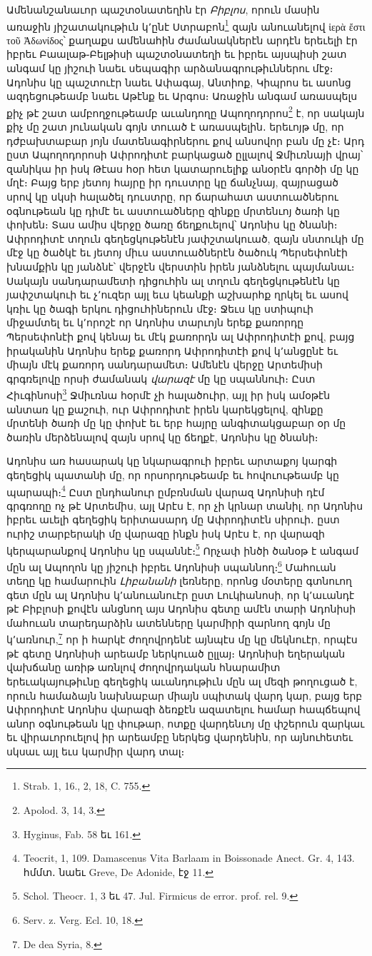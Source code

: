 \documentclass{article}
\begin{document}
{Ամենանշանաւոր պաշտօնատեղին էր \emph{Բիբլոս}, որուն մասին առաջին յիշատակութիւն կ՚ընէ Ստրաբոն\footnote{Strab. 1, 16., 2, 18, C. 755.} զայն անուանելով ἱερὰ ἔστι τοῦ Ἀδωνίδος՝ քաղաքս ամենահին ժամանակներէն արդէն երեւելի էր իբրեւ Բաալաթ֊Բելթիսի պաշտօնատեղի եւ իբրեւ այսպիսի շատ անգամ կը յիշուի նաեւ սեպագիր արձանագրութիւններու մէջ։ Ադոնիս կը պաշտուէր նաեւ Ափագայ, Անտիոք, Կիպրոս եւ ասոնց ազդեցութեամբ նաեւ Աթէնք եւ Արգոս։ Առաջին անգամ առասպելս քիչ թէ շատ ամբողջութեամբ աւանդողը Ապողոդորոս\footnote{Apolod. 3, 14, 3.} է, որ սակայն քիչ մը շատ յունական գոյն տուած է առասպելին․ երեւոյթ մը, որ դժբախտաբար յոյն մատենագիրներու քով անսովոր բան մը չէ։ Արդ ըստ Ապողոդորոսի Ափրոդիտէ բարկացած ըլլալով Ջմիւռնայի վրայ՝ զանիկա իր իսկ Թէաս հօր հետ կատարուելիք անօրէն գործի մը կը մղէ։ Բայց երբ յետոյ հայրը իր դուստրը կը ճանչնայ, զայրացած սրով կը սկսի հալածել դուստրը, որ ճարահատ աստուածներու օգնութեան կը դիմէ եւ աստուածները զինքը մրտենւոյ ծառի կը փոխեն։ Տաս ամիս վերջը ծառը ճեղքուելով՝ Ադոնիս կը ծնանի։ Ափրոդիտէ տղուն գեղեցկութենէն յափշտակուած, զայն սնտուկի մը մէջ կը ծածկէ եւ յետոյ միւս աստուածներէն ծածուկ Պերսեփոնէի խնամքին կը յանձնէ՝ վերջէն վերստին իրեն յանձնելու պայմանաւ։ Սակայն սանդարամետի դիցուհին ալ տղուն գեղեցկութենէն կը յափշտակուի եւ չ՚ուզեր այլ եւս կեանքի աշխարհք ղրկել եւ ասով կռիւ կը ծագի երկու դիցուհիներուն մէջ։ Ջեւս կը ստիպուի միջամտել եւ կ՚որոշէ որ Ադոնիս տարւոյն երեք քառորդը Պերսեփոնէի քով կենայ եւ մէկ քառորդն ալ Ափրոդիտէի քով, բայց իրականին Ադոնիս երեք քառորդ Ափրոդիտէի քով կ՚անցընէ եւ միայն մէկ քառորդ սանդարամետ։ Ամենէն վերջը Արտեմիսի գրգռելովը որսի ժամանակ \emph{վարազէ} մը կը սպաննուի։ Ըստ Հիւգինոսի\footnote{Hyginus, Fab. 58 եւ 161.} Ջմիւռնա հօրմէ չի հալածուիր, այլ իր իսկ ամօթէն անտառ կը քաշուի, ուր Ափրոդիտէ իրեն կարեկցելով, զինքը մրտենի ծառի մը կը փոխէ եւ երբ հայրը անգիտակցաբար օր մը ծառին մերձենալով զայն սրով կը ճեղքէ, Ադոնիս կը ծնանի։

Ադոնիս առ հասարակ կը նկարագրուի իբրեւ արտաքոյ կարգի գեղեցիկ պատանի մը, որ որսորդութեամբ եւ հովուութեամբ կը պարապի։\footnote{Teocrit, 1, 109. Damascenus Vita Barlaam in Boissonade Anect. Gr. 4, 143. հմմտ․ նաեւ Greve, De Adonide, էջ 11.} Ըստ ընդհանուր ըմբռնման վարազ Ադոնիսի դէմ գրգռողը ոչ թէ Արտեմիս, այլ Արէս է, որ չի կրնար տանիլ, որ Ադոնիս իբրեւ աւելի գեղեցիկ երիտասարդ մը Ափրոդիտէն սիրուի․ ըստ ուրիշ տարբերակի մը վարազը ինքն իսկ Արէս է, որ վարազի կերպարանքով Ադոնիս կը սպաննէ։\footnote{Schol. Theocr. 1, 3 եւ 47. Jul. Firmicus de error. prof. rel. 9.} Որչափ ինծի ծանօթ է անգամ մըն ալ Ապողոն կը յիշուի իբրեւ Ադոնիսի սպաննող։\footnote{Serv. z. Verg. Ecl. 10, 18.} Մահուան տեղը կը համարուին \emph{Լիբանանի} լեռները, որոնց մօտերը գտնուող գետ մըն ալ Ադոնիս կ՚անուանուէր ըստ Լուկիանոսի, որ կ՚աւանդէ թէ Բիբլոսի քովէն անցնող այս Ադոնիս գետը ամէն տարի Ադոնիսի մահուան տարեդարձին ատենները կարմիրի զարնող գոյն մը կ՚առնուր,\footnote{De dea Syria, 8.} որ ի հարկէ ժողովրդենէ այնպէս մը կը մեկնուէր, որպէս թէ գետը Ադոնիսի արեամբ ներկուած ըլլայ։ Ադոնիսի եղերական վախճանը առիթ առնլով ժողովրդական հնարամիտ երեւակայութիւնը գեղեցիկ աւանդութիւն մըն ալ մեզի թողուցած է, որուն համաձայն նախնաբար միայն սպիտակ վարդ կար, բայց երբ Ափրոդիտէ Ադոնիս վարազի ձեռքէն ազատելու համար հապճեպով անոր օգնութեան կը փութար, ոտքը վարդենւոյ մը փշերուն զարկաւ եւ վիրաւորուելով իր արեամբը ներկեց վարդենին, որ այնուհետեւ սկսաւ այլ եւս կարմիր վարդ տալ։

}
\end{document}
